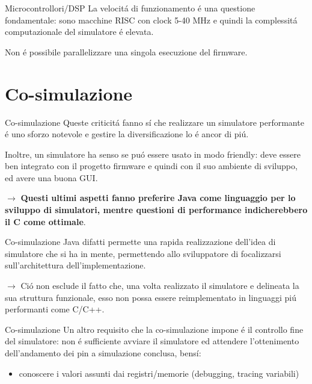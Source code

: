 \documentclass{beamer}
\begin{document}
\begin{frame}{Microcontrollori/DSP}
La velocit\'a di funzionamento \'e una questione fondamentale: sono macchine RISC con clock 5-40 MHz e quindi la complessit\'a computazionale
del simulatore \'e elevata.

\bigskip

Non \'e possibile parallelizzare una singola esecuzione del firmware.
\end{frame}

\section{Co-simulazione}
\begin{frame}{Co-simulazione}
Queste criticit\'a fanno s\'i che realizzare un simulatore performante \'e uno sforzo notevole e gestire la diversificazione
lo \'e ancor di pi\'u.

\bigskip

Inoltre, un simulatore ha senso se pu\'o essere usato in modo friendly: deve essere ben integrato con il progetto firmware
e quindi con il suo ambiente di sviluppo, ed avere una buona GUI.

\bigskip

$\rightarrow$ \textbf{Questi ultimi aspetti fanno preferire Java come linguaggio per lo sviluppo di simulatori, mentre questioni di performance
indicherebbero il C come ottimale}.
\end{frame}

\begin{frame}{Co-simulazione}
Java difatti permette una rapida realizzazione dell'idea di simulatore che si ha in mente, permettendo allo sviluppatore di
focalizzarsi sull'architettura dell'implementazione. 

\bigskip

$\rightarrow$ Ci\'o non esclude il fatto che, una volta realizzato il simulatore e delineata la sua struttura funzionale, esso
non possa essere reimplementato in linguaggi pi\'u performanti come C/C++.
\end{frame}

\begin{frame}{Co-simulazione}
Un altro requisito che la co-simulazione impone \'e il controllo fine del simulatore: non \'e sufficiente avviare il simulatore ed
attendere l'ottenimento dell'andamento dei pin a simulazione conclusa, bens\'i:
\begin{itemize}
  \item conoscere i valori assunti dai registri/memorie (debugging, tracing variabili)
\end{itemize}
\end{frame}
\end{document}
